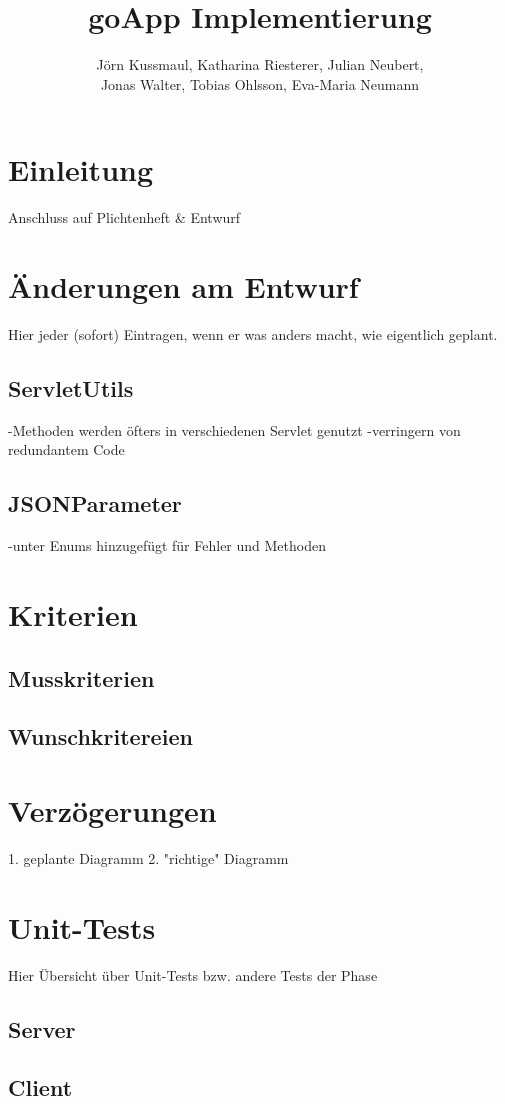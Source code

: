 \documentclass{scrartcl}
\title{goApp Implementierung}
\author{Jörn Kussmaul, Katharina Riesterer, Julian Neubert,\\ Jonas Walter, Tobias Ohlsson, Eva-Maria Neumann}
\begin{document}
	\maketitle
	\newpage
	\tableofcontents
	\newpage

	\section{Einleitung}
	Anschluss auf Plichtenheft \& Entwurf
	
	\newpage
	\section{Änderungen am Entwurf}
	Hier jeder (sofort) Eintragen, wenn er was anders macht, wie eigentlich geplant.
	
	\subsection{ServletUtils}
	-Methoden werden öfters in verschiedenen Servlet genutzt
	-verringern von redundantem Code
	
	\subsection{JSONParameter}
	-unter Enums hinzugefügt für Fehler und Methoden
	\newpage
	\section{Kriterien}
	\subsection{Musskriterien}
	\subsection{Wunschkritereien}
	
	\newpage
	\section{Verzögerungen}
	1. geplante Diagramm
	2. "richtige" Diagramm
	
	\newpage
	\section{Unit-Tests}
	Hier Übersicht über Unit-Tests bzw. andere Tests der Phase
	\subsection{Server}
	\subsection{Client}
	
\end{document}
